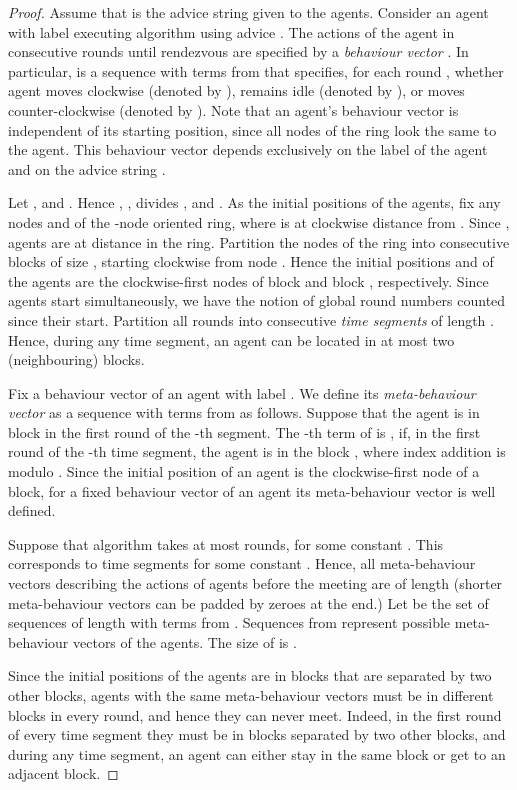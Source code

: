 \documentclass{llncs}
\begin{document}
\begin{proof}
Assume that  is the advice string given to the agents. Consider an agent with 
label  executing algorithm  using advice . The actions of the agent in consecutive rounds until rendezvous are specified by  
a \emph{behaviour vector} . In particular,  is a sequence with terms from  that specifies, for each round , whether agent   moves clockwise (denoted by ), remains idle (denoted by ), or moves counter-clockwise (denoted by ). Note that an agent's behaviour vector is independent of its starting position, since all nodes of the ring look the same to the agent.  This behaviour vector depends exclusively on the label of the agent and on the advice string .

Let ,  and . Hence , ,  divides , and . 
As the initial positions of the agents,
fix any nodes  and  of the -node oriented ring, where  is at clockwise distance  from . Since ,
agents are at distance  in the ring. 
Partition the nodes of the ring into  consecutive blocks  of size , starting clockwise from node .
Hence the initial positions  and  of the agents are the clockwise-first nodes of block  and block , respectively.
Since agents start simultaneously, we have the notion of global round numbers counted since their start.
Partition all rounds  into consecutive {\em time segments} of length . Hence, during any time segment, an agent can be
located in at most two (neighbouring) blocks.

Fix a behaviour vector  of an agent with label .
We define its {\em meta-behaviour vector} as a sequence   with terms from  as follows. 
Suppose that the agent is in block  in the first round of the -th segment.
The -th term of  is , if, in the first round of the -th time segment, the agent is in the block , where index addition is modulo . 
Since the initial position of an agent  is the clockwise-first node of a block, for a fixed behaviour vector of an agent its meta-behaviour vector is well defined.

Suppose that algorithm  takes at most  rounds, for some constant . This corresponds to  time segments for some constant . Hence,
all meta-behaviour vectors describing the actions of agents before the meeting are of length  (shorter meta-behaviour vectors can be padded by zeroes at the end.) Let  be the set of sequences of length  with 
terms from . Sequences from  represent possible meta-behaviour vectors of the agents. The size of  is . 

Since the initial positions of the agents are in blocks that are separated by two other blocks, agents with the same
meta-behaviour vectors must be in different blocks in every round, and hence they can never meet. Indeed, in the first round of every time segment they must be in blocks separated by two other blocks, and during any time segment, an agent can either stay in the same block or get to an adjacent block.


\end{proof}
\end{document}
